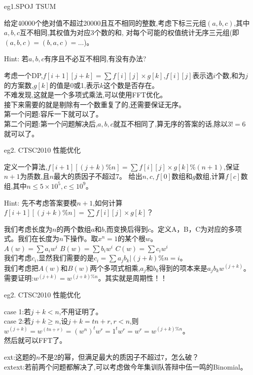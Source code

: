 \documentclass[allowframebreaks,10pt]{beamer}
\begin{document}
\begin{frame}{eg1.SPOJ TSUM}
\begin{example}
给定40000个绝对值不超过20000且互不相同的整数,考虑下标三元组$(a,b,c)$,其中$a,b,c$互不相同,其权值为对应3个数的和,
	对每个可能的权值统计无序三元组(即$(a,b,c)=(b,a,c)=\ldots$)。
\end{example}
Hint: 若$a,b,c$有序且不必互不相同,有没有办法?
\begin{solution}
考虑一个DP,$f[i+1][j+k]=\sum f[i][j] \times g[k]$,$f[i][j]$表示选$i$个数,和为$j$的方案数,$g[k]$的值是0或1,表示$k$这个数是否存在。\\
\pause
不难发现,这就是一个多项式乘法,可以使用FFT优化。\\
\pause
接下来需要的就是剔除有一个数重复了的,还需要保证无序。\\
\pause
第一个问题:容斥一下就可以了。\\
\pause
第二个问题:第一个问题解决后,$a,b,c$就互不相同了,算无序的答案的话,除以$3! = 6$就可以了。
\end{solution}
\end{frame}

\begin{frame}{eg2. CTSC2010 性能优化}
\begin{example}
定义一个算法,$f[i+1][(j+k)\%n]=\sum f[i][j] \times g[k] \% (n+1)$,保证$n+1$为质数,且$n$最大的质因子不超过7。
给出$n,c,f[0]$数组和$g$数组,计算$f[c]$数组,其中$n \le 5 \times 10^5, c \le 10^9$。
\end{example}
Hint: 先不考虑答案要模$n+1$,如何计算$f[i+1][(j+k)\%n]=\sum f[i][j] \times g[k]$？
\begin{solution}
我们考虑长度为$n$的两个数组$a$和$b$,而变换后得到$c$。定义A，B，C为对应的多项式。我们在长度为$n$下操作。取$x^n=1$的某个根$w$。 \\
$A(w)=\sum a_iw^i$ \vspace{3pt} 
$B(w)=\sum b_iw^i$ \vspace{3pt} 
$C(w)=\sum c_iw^i$ \vspace{3pt} \\
我们考虑$c_i$,显然我们需要的是$c_i=\sum a_jb_k | (j+k)\% n=i$。\\
\pause
我们考虑把$A(w)$和$B(w)$两个多项式相乘,$a_j$和$b_k$得到的项本来是$a_jb_kw^{(j+k)}$。\\
\pause
需要证明:$w^{(j+k)}=w^{(j+k)\%n}$。其实就是周期性！！
\end{solution}
\end{frame}

\begin{frame}{eg2. CTSC2010 性能优化}
\begin{solution}
case 1:若$j+k<n$,不用证明了。\\
case 2:若$j+k\ge n$,设$j+k=tn+r,r<n$,则$w^{(j+k)}=w^{(tn+r)}=(w^n)^t w^r=1^t w^r=w^r=w^{(j+k)\%n}$。 \\
然后就可以FFT了。
\end{solution}
\pause
ext:这题的$n$不是2的幂，但满足最大的质因子不超过7，怎么破？ \\
\pause
extext:若前两个问题都解决了,可以考虑做今年集训队答辩中伍一鸣的Binomial。
\end{frame}
\end{document}

